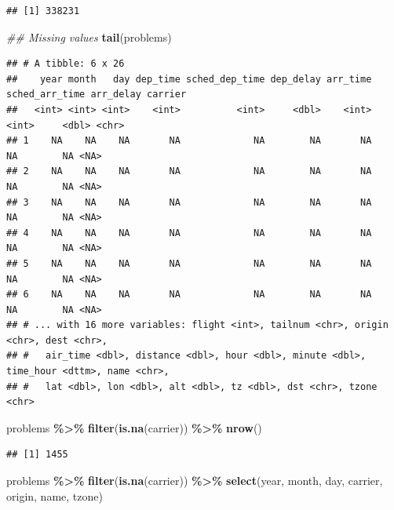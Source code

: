 \documentclass[
]{article}
\newenvironment{Shaded}{\begin{snugshade}}{\end{snugshade}}
\newcommand{\CommentTok}[1]{\textcolor[rgb]{0.56,0.35,0.01}{\textit{#1}}}
\newcommand{\KeywordTok}[1]{\textcolor[rgb]{0.13,0.29,0.53}{\textbf{#1}}}
\newcommand{\NormalTok}[1]{#1}
\newcommand{\OperatorTok}[1]{\textcolor[rgb]{0.81,0.36,0.00}{\textbf{#1}}}
\newcommand{\StringTok}[1]{\textcolor[rgb]{0.31,0.60,0.02}{#1}}
\begin{document}
\begin{verbatim}
## [1] 338231
\end{verbatim}

\begin{Shaded}
\begin{Highlighting}[]
\CommentTok{\#\# Missing values}
\KeywordTok{tail}\NormalTok{(problems)}
\end{Highlighting}
\end{Shaded}

\begin{verbatim}
## # A tibble: 6 x 26
##    year month   day dep_time sched_dep_time dep_delay arr_time sched_arr_time arr_delay carrier
##   <int> <int> <int>    <int>          <int>     <dbl>    <int>          <int>     <dbl> <chr>  
## 1    NA    NA    NA       NA             NA        NA       NA             NA        NA <NA>   
## 2    NA    NA    NA       NA             NA        NA       NA             NA        NA <NA>   
## 3    NA    NA    NA       NA             NA        NA       NA             NA        NA <NA>   
## 4    NA    NA    NA       NA             NA        NA       NA             NA        NA <NA>   
## 5    NA    NA    NA       NA             NA        NA       NA             NA        NA <NA>   
## 6    NA    NA    NA       NA             NA        NA       NA             NA        NA <NA>   
## # ... with 16 more variables: flight <int>, tailnum <chr>, origin <chr>, dest <chr>,
## #   air_time <dbl>, distance <dbl>, hour <dbl>, minute <dbl>, time_hour <dttm>, name <chr>,
## #   lat <dbl>, lon <dbl>, alt <dbl>, tz <dbl>, dst <chr>, tzone <chr>
\end{verbatim}

\begin{Shaded}
\begin{Highlighting}[]
\NormalTok{problems }\OperatorTok{\%\textgreater{}\%}\StringTok{ }
\StringTok{    }\KeywordTok{filter}\NormalTok{(}\KeywordTok{is.na}\NormalTok{(carrier)) }\OperatorTok{\%\textgreater{}\%}\StringTok{ }
\StringTok{    }\KeywordTok{nrow}\NormalTok{()}
\end{Highlighting}
\end{Shaded}

\begin{verbatim}
## [1] 1455
\end{verbatim}

\begin{Shaded}
\begin{Highlighting}[]
\NormalTok{problems }\OperatorTok{\%\textgreater{}\%}\StringTok{ }
\StringTok{    }\KeywordTok{filter}\NormalTok{(}\KeywordTok{is.na}\NormalTok{(carrier)) }\OperatorTok{\%\textgreater{}\%}\StringTok{ }
\StringTok{    }\KeywordTok{select}\NormalTok{(year, month, day, carrier, origin, name, tzone)}
\end{Highlighting}
\end{Shaded}
\end{document}
